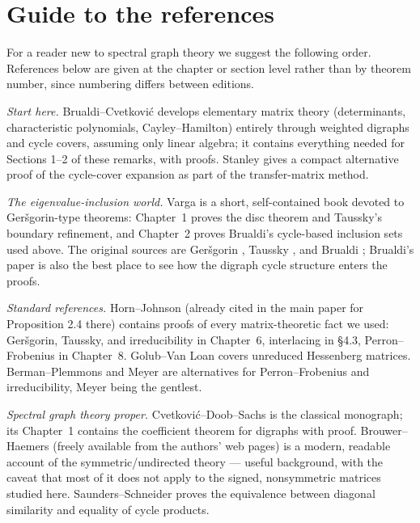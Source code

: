 \documentclass[11pt, fleqn]{amsart}
\theoremstyle{remark}
\begin{document}
\section{Guide to the references}\label{sec:guide}

For a reader new to spectral graph theory we suggest the following
order. References below are given at the chapter or section level
rather than by theorem number, since numbering differs between
editions.

\emph{Start here.} Brualdi--Cvetkovi\'c \cite{BC09} develops elementary
matrix theory (determinants, characteristic polynomials,
Cayley--Hamilton) entirely through weighted digraphs and cycle covers,
assuming only linear algebra; it contains everything needed for
Sections 1--2 of these remarks, with proofs. Stanley
\cite[\S 4.7]{Stanley12} gives a compact alternative proof of the
cycle-cover expansion as part of the transfer-matrix method.

\emph{The eigenvalue-inclusion world.} Varga \cite{Varga04} is a short,
self-contained book devoted to Ger\v{s}gorin-type theorems: Chapter~1
proves the disc theorem and Taussky's boundary refinement, and
Chapter~2 proves Brualdi's cycle-based inclusion sets used above. The
original sources are Ger\v{s}gorin \cite{Ger31}, Taussky
\cite{Taussky49}, and Brualdi \cite{Brualdi82}; Brualdi's paper is also
the best place to see how the digraph cycle structure enters the
proofs.

\emph{Standard references.} Horn--Johnson \cite{HJ13} (already cited in
the main paper for Proposition 2.4 there) contains proofs of every
matrix-theoretic fact we used: Ger\v{s}gorin, Taussky, and
irreducibility in Chapter~6, interlacing in \S 4.3, Perron--Frobenius
in Chapter~8. Golub--Van Loan \cite[\S 7.4]{GVL13} covers unreduced
Hessenberg matrices. Berman--Plemmons \cite{BP94} and Meyer
\cite{Meyer00} are alternatives for Perron--Frobenius and
irreducibility, Meyer being the gentlest.

\emph{Spectral graph theory proper.} Cvetkovi\'c--Doob--Sachs
\cite{CDS95} is the classical monograph; its Chapter~1 contains the
coefficient theorem for digraphs with proof. Brouwer--Haemers
\cite{BH12} (freely available from the authors' web pages) is a modern,
readable account of the symmetric/undirected theory --- useful
background, with the caveat that most of it does not apply to the
signed, nonsymmetric matrices studied here. Saunders--Schneider
\cite{SS78} proves the equivalence between diagonal similarity and
equality of cycle products.
\end{document}
